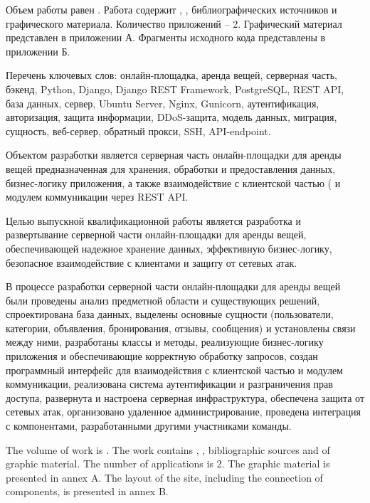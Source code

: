
Объем работы равен . Работа содержит , ,  библиографических источников и  графического материала. Количество приложений – 2. Графический материал представлен в приложении А. Фрагменты исходного кода представлены в приложении Б.

Перечень ключевых слов: онлайн-площадка, аренда вещей, серверная часть, бэкенд, Python, Django, Django REST Framework, PostgreSQL, REST API, база данных, сервер, Ubuntu Server, Nginx, Gunicorn, аутентификация, авторизация, защита информации, DDoS-защита, модель данных, миграция, сущность, веб-сервер, обратный прокси, SSH, API-endpoint.

Объектом разработки является серверная часть онлайн-площадки для аренды вещей предназначенная для хранения, обработки и предоставления данных, бизнес-логику приложения, а также взаимодействие с клиентской частью ( и модулем коммуникации через REST API.

Целью выпускной квалификационной работы является разработка и развертывание серверной части онлайн-площадки для аренды вещей, обеспечивающей надежное хранение данных, эффективную бизнес-логику, безопасное взаимодействие с клиентами и защиту от сетевых атак.

В процессе разработки серверной части онлайн-площадки для аренды вещей были проведены анализ предметной области и существующих решений, спроектирована база данных, выделены основные сущности (пользователи, категории, объявления, бронирования, отзывы, сообщения) и установлены связи между ними, разработаны классы и методы, реализующие бизнес-логику приложения и обеспечивающие корректную обработку запросов, создан программный интерфейс для взаимодействия с клиентской частью и модулем коммуникации, реализована система аутентификации и разграничения прав доступа, развернута и настроена серверная инфраструктура, обеспечена защита от сетевых атак, организовано удаленное администрирование, проведена интеграция с компонентами, разработанными другими участниками команды.

  
The volume of work is . The work contains , ,  bibliographic sources and  of graphic material. The number of applications is 2. The graphic material is presented in annex A. The layout of the site, including the connection of components, is presented in annex B.

